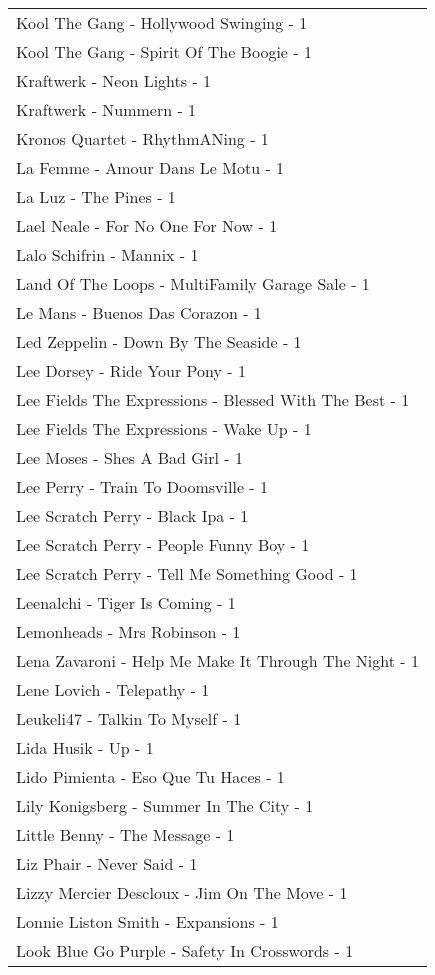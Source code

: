 \documentclass[
]{article}
\begin{document}
\begin{longtable}{l}
Kool The Gang - Hollywood Swinging - 1 \\ 
Kool The Gang - Spirit Of The Boogie - 1 \\ 
Kraftwerk - Neon Lights - 1 \\ 
Kraftwerk - Nummern - 1 \\ 
Kronos Quartet - RhythmANing - 1 \\ 
La Femme - Amour Dans Le Motu - 1 \\ 
La Luz - The Pines - 1 \\ 
Lael Neale - For No One For Now - 1 \\ 
Lalo Schifrin - Mannix - 1 \\ 
Land Of The Loops - MultiFamily Garage Sale - 1 \\ 
Le Mans - Buenos Das Corazon - 1 \\ 
Led Zeppelin - Down By The Seaside - 1 \\ 
Lee Dorsey - Ride Your Pony - 1 \\ 
Lee Fields The Expressions - Blessed With The Best - 1 \\ 
Lee Fields The Expressions - Wake Up - 1 \\ 
Lee Moses - Shes A Bad Girl - 1 \\ 
Lee Perry - Train To Doomsville - 1 \\ 
Lee Scratch Perry - Black Ipa - 1 \\ 
Lee Scratch Perry - People Funny Boy - 1 \\ 
Lee Scratch Perry - Tell Me Something Good - 1 \\ 
Leenalchi - Tiger Is Coming - 1 \\ 
Lemonheads - Mrs Robinson - 1 \\ 
Lena Zavaroni - Help Me Make It Through The Night - 1 \\ 
Lene Lovich - Telepathy - 1 \\ 
Leukeli47 - Talkin To Myself - 1 \\ 
Lida Husik - Up - 1 \\ 
Lido Pimienta - Eso Que Tu Haces - 1 \\ 
Lily Konigsberg - Summer In The City - 1 \\ 
Little Benny - The Message - 1 \\ 
Liz Phair - Never Said - 1 \\ 
Lizzy Mercier Descloux - Jim On The Move - 1 \\ 
Lonnie Liston Smith - Expansions - 1 \\ 
Look Blue Go Purple - Safety In Crosswords - 1 \\ 

\end{longtable}
\end{document}
